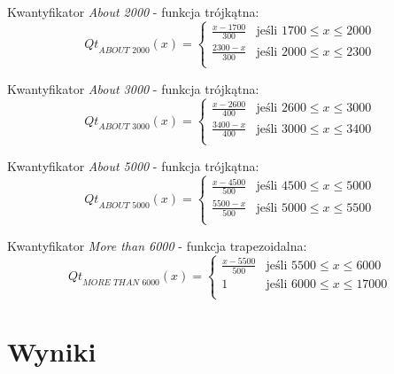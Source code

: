 \documentclass{classrep}
\begin{document}
Kwantyfikator \textit{About 2000} - funkcja trójkątna:
\begin{equation}
{Qt}_{\textit{ABOUT 2000}}(x)= \left\{ \begin{array}{ll}
\frac{x-1700}{300} 	 & \textrm{jeśli $1700 \leq x \leq 2000$} \\
\frac{2300-x}{300} 	 & \textrm{jeśli $2000 \leq x \leq 2300$} \\
\end{array} \right.
\end{equation}

Kwantyfikator \textit{About 3000} - funkcja trójkątna:
\begin{equation}
{Qt}_{\textit{ABOUT 3000}}(x)= \left\{ \begin{array}{ll}
\frac{x-2600}{400} 	 & \textrm{jeśli $2600 \leq x \leq 3000$} \\
\frac{3400-x}{400} 	 & \textrm{jeśli $3000 \leq x \leq 3400$} \\
\end{array} \right.
\end{equation}

Kwantyfikator \textit{About 5000} - funkcja trójkątna:
\begin{equation}
{Qt}_{\textit{ABOUT 5000}}(x)= \left\{ \begin{array}{ll}
\frac{x-4500}{500} 	 & \textrm{jeśli $4500 \leq x \leq 5000$} \\
\frac{5500-x}{500} 	 & \textrm{jeśli $5000 \leq x \leq 5500$} \\
\end{array} \right.
\end{equation}

Kwantyfikator \textit{More than 6000} - funkcja trapezoidalna:
\begin{equation}
{Qt}_{\textit{MORE THAN 6000}}(x)= \left\{ \begin{array}{ll}
\frac{x-5500}{500} 	 & \textrm{jeśli $5500 \leq x \leq 6000$} \\
1 			& \textrm{jeśli $6000 \leq x \leq 17000$} \\
\end{array} \right.
\end{equation}

\clearpage





\section{Wyniki}
\end{document}

